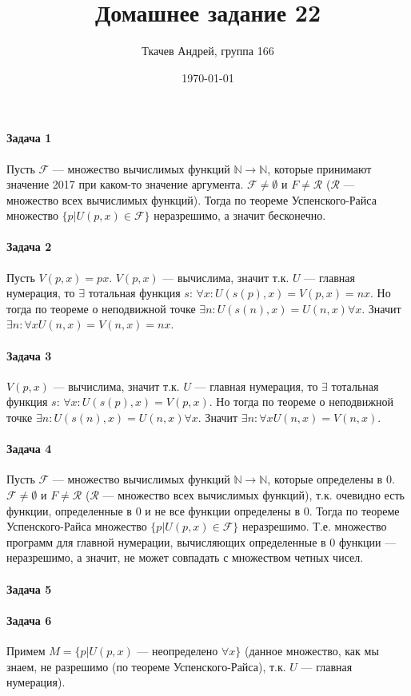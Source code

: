 \documentclass{article}
\title{Домашнее задание 22}
\author{Ткачев Андрей, группа 166}
\date{\today}
\newcommand{\N}{\mathbb{N}}
\begin{document}
    \maketitle
	\paragraph{Задача 1}
        Пусть $\mathcal{F}$ --- множество вычислимых функций $\N \rightarrow \N$, которые принимают значение 2017 при каком-то значение аргумента. $\mathcal{F} \ne \emptyset$ и $F \ne \mathcal{R}$ ($\mathcal{R}$ --- множество всех вычислимых функций). Тогда по теореме Успенского-Райса множество $\{p | U(p, x) \in \mathcal{F}\}$ неразрешимо, а значит бесконечно.
    \paragraph{Задача 2} 
		Пусть $V(p, x) = px$. $V(p, x)$ --- вычислима, значит т.к. $U$ --- главная нумерация, то $\exists$ тотальная функция $s$: $\forall x: U(s(p), x) = V(p, x) = nx$. Но тогда по теореме о неподвижной точке $\exists n: U(s(n), x) = U(n, x) \forall x$. Значит $\exists n: \forall x U(n, x) = V(n, x) = nx$.
	\paragraph{Задача 3}
		$V(p, x)$ --- вычислима, значит т.к. $U$ --- главная нумерация, то $\exists$ тотальная функция $s$: $\forall x: U(s(p), x) = V(p, x)$. Но тогда по теореме о неподвижной точке $\exists n: U(s(n), x) = U(n, x) \forall x$. Значит $\exists n: \forall x U(n, x) = V(n, x)$.
	\paragraph{Задача 4}
		Пусть $\mathcal{F}$ --- множество вычислимых функций $\N \rightarrow \N$, которые определены в 0. $\mathcal{F} \ne \emptyset$ и $F \ne \mathcal{R}$ ($\mathcal{R}$ --- множество всех вычислимых функций), т.к. очевидно есть функции, определенные в 0 и не все функции определены в 0. Тогда по теореме Успенского-Райса множество $\{p | U(p, x) \in \mathcal{F}\}$ неразрешимо. Т.е. множество программ для главной нумерации, вычисляющих определенные в 0 функции --- неразрешимо, а значит, не может совпадать с множеством четных чисел.
	\paragraph{Задача 5}
	\paragraph{Задача 6}
		Примем $M = \{p| U(p, x)$ --- неопределено $\forall x\}$ (данное множество, как мы знаем, не разрешимо (по теореме Успенского-Райса), т.к. $U$ --- главная нумерация). 
\end{document}
